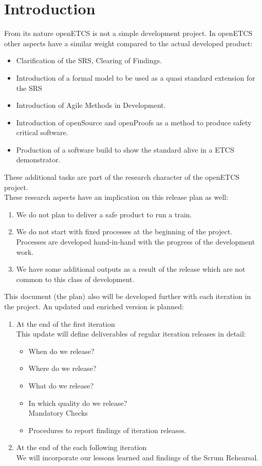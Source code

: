 \documentclass{template/openetcs_report}
\begin{document}
\chapter{Introduction}
From its nature openETCS is not a simple development project. In openETCS other aspects have a similar weight compared to the actual developed product:
\begin{itemize}
\item Clarification of the SRS, Clearing of Findings.
\item Introduction of a formal model to be used as a quasi standard extension for the SRS
\item Introduction of Agile Methods in Development.
\item Introduction of openSource and openProofs as a method to produce safety critical software.
\item Production of a software build to show the standard alive in a ETCS demonstrator.
\end{itemize} 
These additional tasks are part of the research character of the openETCS project.\\
These research aspects have an implication on this release plan as well:
\begin{enumerate}
\item We do not plan to deliver a safe product to run a train. 
\item We do not start with fixed processes at the beginning of the project. Processes are developed hand-in-hand with the progress of the development work.
\item We have some additional outputs as a result of the release which are not common to this class of development.
\end{enumerate}

This document (the plan) also will be developed further with each iteration in the project. An updated and enriched version is planned:
\begin{enumerate}
\item At the end of the first iteration\\
This update will define deliverables of regular iteration releases in detail:
\begin {itemize}
\item When do we release?
\item Where do we release?
\item What do we release?
\item In which quality do we release?\\
Mandatory Checks
\item Procedures to report findings of iteration releases.
\end{itemize}

\item At the end of the each following iteration\\
We will incorporate our lessons learned and findings of the Scrum Rehearsal. 
\end{enumerate}
\end{document}

